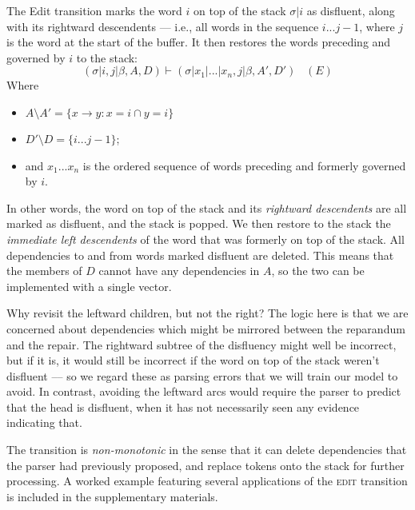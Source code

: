 \documentclass[11pt,letterpaper]{article}
\begin{document}
The Edit transition marks the word $i$ on top of the stack $\sigma | i$ as
disfluent, along with its rightward descendents --- i.e., all words in the
sequence $i...j-1$, where $j$ is the word at the start of the buffer. It then
restores the words preceding and governed by $i$ to the stack:
\begin{equation}
    (\sigma | i, j | \beta, A, D) \vdash (\sigma | x_1 | ... | x_n, j | \beta,A',D')\;\;\;(E)
    \nonumber
\end{equation}
Where 
\begin{itemize}
    \itemsep0em
    \item $A \setminus A' = \{x \rightarrow y : x = i \cap y = i \}$
    \item $D' \setminus D = \{i...j-1\}$;
\item  and $x_1...x_n$ is the ordered sequence of words preceding and formerly governed
by $i$.
\end{itemize}
In other words, the word on top of the stack and its \emph{rightward descendents}
are all marked as disfluent, and the stack is popped. We then restore to the stack
the \emph{immediate left descendents} of the word that was formerly on top of the
stack. All dependencies to and from words marked disfluent are deleted. 
This means that the members of $D$ cannot have any dependencies in $A$, so the
two can be implemented with a single vector.

Why revisit the leftward children, but not the right? The logic here is that we
are concerned about dependencies which might be mirrored between the reparandum
and the repair. The rightward subtree of the disfluency might well be incorrect,
but if it is, it would still be incorrect if the word on top of the stack weren't
disfluent --– so we regard these as parsing errors that we will train our model
to avoid. In contrast, avoiding the leftward arcs would require the parser to
predict that the head is disfluent, when it has not necessarily seen any evidence
indicating that.

The transition is \emph{non-monotonic} in the sense that it can delete dependencies
that the parser had previously proposed, and replace tokens onto the stack for
further processing. 
A worked example featuring several applications of the \textsc{edit} transition
is included in the supplementary materials.
\end{document}
